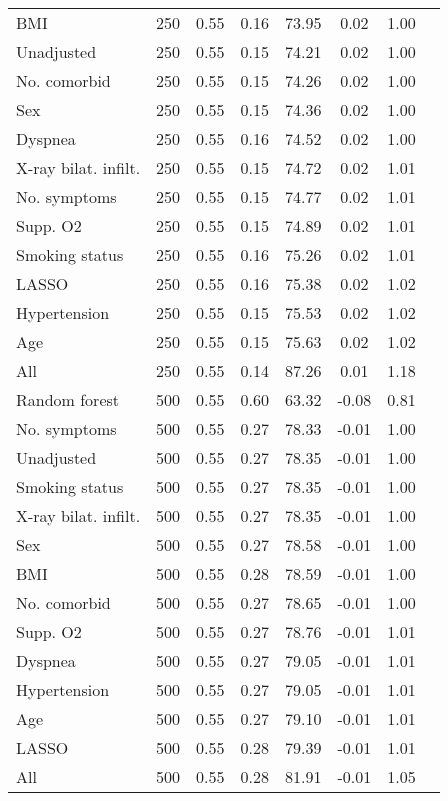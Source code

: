 \documentclass{article}
\begin{document}
{\begin{longtable}{lccccccc}
BMI & 250 & 0.55 & 0.16 &  73.95 &  0.02 & 1.00 \\ 
Unadjusted & 250 & 0.55 & 0.15 &  74.21 &  0.02 & 1.00 \\ 
No. comorbid & 250 & 0.55 & 0.15 &  74.26 &  0.02 & 1.00 \\ 
Sex & 250 & 0.55 & 0.15 &  74.36 &  0.02 & 1.00 \\ 
Dyspnea & 250 & 0.55 & 0.16 &  74.52 &  0.02 & 1.00 \\ 
X-ray bilat. infilt. & 250 & 0.55 & 0.15 &  74.72 &  0.02 & 1.01 \\ 
No. symptoms & 250 & 0.55 & 0.15 &  74.77 &  0.02 & 1.01 \\ 
Supp. O2 & 250 & 0.55 & 0.15 &  74.89 &  0.02 & 1.01 \\ 
Smoking status & 250 & 0.55 & 0.16 &  75.26 &  0.02 & 1.01 \\ 
LASSO & 250 & 0.55 & 0.16 &  75.38 &  0.02 & 1.02 \\ 
Hypertension & 250 & 0.55 & 0.15 &  75.53 &  0.02 & 1.02 \\ 
Age & 250 & 0.55 & 0.15 &  75.63 &  0.02 & 1.02 \\ 
All & 250 & 0.55 & 0.14 &  87.26 &  0.01 & 1.18 \\ \midrule() 
Random forest & 500 & 0.55 & 0.60 &  63.32 & -0.08 & 0.81 \\ 
No. symptoms & 500 & 0.55 & 0.27 &  78.33 & -0.01 & 1.00 \\ 
Unadjusted & 500 & 0.55 & 0.27 &  78.35 & -0.01 & 1.00 \\ 
Smoking status & 500 & 0.55 & 0.27 &  78.35 & -0.01 & 1.00 \\ 
X-ray bilat. infilt. & 500 & 0.55 & 0.27 &  78.35 & -0.01 & 1.00 \\ 
Sex & 500 & 0.55 & 0.27 &  78.58 & -0.01 & 1.00 \\ 
BMI & 500 & 0.55 & 0.28 &  78.59 & -0.01 & 1.00 \\ 
No. comorbid & 500 & 0.55 & 0.27 &  78.65 & -0.01 & 1.00 \\ 
Supp. O2 & 500 & 0.55 & 0.27 &  78.76 & -0.01 & 1.01 \\ 
Dyspnea & 500 & 0.55 & 0.27 &  79.05 & -0.01 & 1.01 \\ 
Hypertension & 500 & 0.55 & 0.27 &  79.05 & -0.01 & 1.01 \\ 
Age & 500 & 0.55 & 0.27 &  79.10 & -0.01 & 1.01 \\ 
LASSO & 500 & 0.55 & 0.28 &  79.39 & -0.01 & 1.01 \\ 
All & 500 & 0.55 & 0.28 &  81.91 & -0.01 & 1.05 \\ \midrule() 

\end{longtable}}
\end{document}
